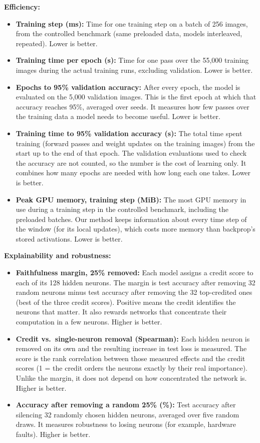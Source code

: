 {\noindent\textbf{Efficiency:}
\begin{itemize}
  \item \textbf{Training step (ms):} Time for one training step on a batch of 256 images, from the controlled benchmark (same preloaded data, models interleaved, repeated). Lower is better.
  \item \textbf{Training time per epoch (s):} Time for one pass over the 55,000 training images during the actual training runs, excluding validation. Lower is better.
  \item \textbf{Epochs to 95\% validation accuracy:} After every epoch, the model is evaluated on the 5,000 validation images. This is the first epoch at which that accuracy reaches 95\%, averaged over seeds. It measures how few passes over the training data a model needs to become useful. Lower is better.
  \item \textbf{Training time to 95\% validation accuracy (s):} The total time spent training (forward passes and weight updates on the training images) from the start up to the end of that epoch. The validation evaluations used to check the accuracy are not counted, so the number is the cost of learning only. It combines how many epochs are needed with how long each one takes. Lower is better.
  \item \textbf{Peak GPU memory, training step (MiB):} The most GPU memory in use during a training step in the controlled benchmark, including the preloaded batches. Our method keeps information about every time step of the window (for its local updates), which costs more memory than backprop's stored activations. Lower is better.
\end{itemize}

\noindent\textbf{Explainability and robustness:}
\begin{itemize}
  \item \textbf{Faithfulness margin, 25\% removed:} Each model assigns a credit score to each of its 128 hidden neurons. The margin is test accuracy after removing 32 random neurons minus test accuracy after removing the 32 top-credited ones (best of the three credit scores). Positive means the credit identifies the neurons that matter. It also rewards networks that concentrate their computation in a few neurons. Higher is better.
  \item \textbf{Credit vs.\ single-neuron removal (Spearman):} Each hidden neuron is removed on its own and the resulting increase in test loss is measured. The score is the rank correlation between those measured effects and the credit scores (1 = the credit orders the neurons exactly by their real importance). Unlike the margin, it does not depend on how concentrated the network is. Higher is better.
  \item \textbf{Accuracy after removing a random 25\% (\%):} Test accuracy after silencing 32 randomly chosen hidden neurons, averaged over five random draws. It measures robustness to losing neurons (for example, hardware faults). Higher is better.
\end{itemize}

}
